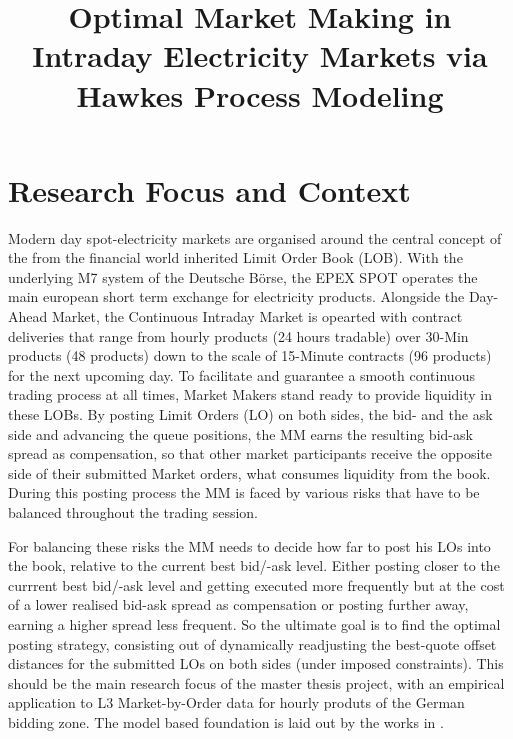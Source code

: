\documentclass[11pt,a4paper]{cau_exec_summary}
\title{Optimal Market Making in Intraday Electricity Markets via Hawkes Process Modeling}
\begin{document}
\executivesummaryfrontmatter
\section{Research Focus and Context}
Modern day spot-electricity markets are organised around the central concept of the from the financial world inherited Limit Order Book (LOB). With the underlying M7 system of the Deutsche Börse, the EPEX SPOT operates the main european short term exchange for electricity products. Alongside the Day-Ahead Market, the Continuous Intraday Market is opearted with contract deliveries that range from hourly products (24 hours tradable) over 30-Min products (48 products) down to the scale of 15-Minute contracts (96 products) for the next upcoming day. To facilitate and guarantee a smooth continuous trading process at all times, Market Makers stand ready to provide liquidity in these LOBs. By posting Limit Orders (LO) on both sides, the bid- and the ask side and advancing the queue positions, the MM earns the resulting bid-ask spread as compensation, so that other market participants receive the opposite side of their submitted Market orders, what consumes liquidity from the book. During this posting process the MM is faced by various risks that have to be balanced throughout the trading session.

For balancing these risks the MM needs to decide how far to post his LOs into the book, relative to the current best bid/-ask level. Either posting closer to the currrent best bid/-ask level and getting executed more frequently but at the cost of a lower realised bid-ask spread as compensation or posting further away, earning a higher spread less frequent. So the ultimate goal is to find the optimal posting strategy, consisting out of dynamically readjusting the best-quote offset distances for the submitted LOs on both sides (under imposed constraints). This should be the main research focus of the master thesis project, with an empirical application to L3 Market-by-Order data for hourly produts of the German bidding zone. The model based foundation is laid out by the works in \cite{luckner2021hawkes}.
\end{document}
